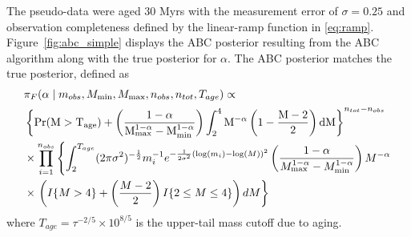 \documentclass[12pt]{article}
\newcommand{\Proba}{\rm{Pr}}
\begin{document}
The pseudo-data were aged 30 Myrs with the measurement error of $\sigma = 0.25$ and observation completeness defined by the linear-ramp function in \eqref{eq:ramp}.  Figure~\ref{fig:abc_simple} displays  the ABC posterior resulting from the ABC algorithm along with the true posterior for $\alpha$.  The ABC posterior matches the true posterior, defined as 
\begin{align}
&\pi_F(\alpha \mid  m_{obs}, M_{\min}, M_{\max}, n_{obs}, n_{tot}, T_{age}) \propto  \label{eq:simple_posterior}\\ 
&\left \{\Proba(M>T_{age})+\left(\frac{1-\alpha}{M_{\max}^{1-\alpha}-M_{\min}^{1-\alpha}}\right)\int_2^4 M^{-\alpha}\left(1-\frac{M-2}{2}\right )dM\right \}^{n_{tot}-n_{obs}}  \nonumber \\ \nonumber
& \times \prod_{i=1}^{n_{obs}}\left\{ \int_2^{T_{age}}(2\pi\sigma^2)^{-\frac{1}{2}}m_i^{-1}e^{-\frac{1}{2\sigma^2}(\log(m_i)-\log(M))^2} \left(\frac{1-\alpha}{M_{\max}^{1-\alpha}-M_{\min}^{1-\alpha}}\right)M^{-\alpha} \right.\\ \nonumber
& \times  \left.\left(I\{M>4\}+\left(\frac{M-2}{2}\right)I\{2\leq M\leq 4\}\right) dM \right\} 
\end{align}
where $T_{age} = \tau^{-2/5} \times 10^{8/5}$ is the upper-tail mass cutoff due to aging.
\end{document}
